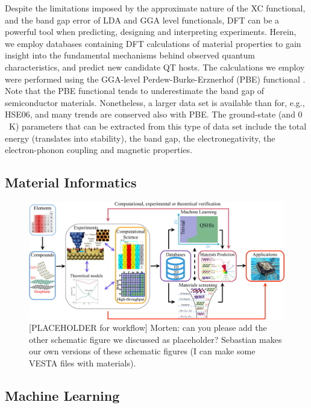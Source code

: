 \documentclass[superscriptaddress,unsortedaddress,
 amsmath,amssymb,
 aps,
]{revtex4-2}
\begin{document}
Despite the limitations imposed by the approximate nature of the XC functional, and the band gap error of LDA and GGA level functionals, 
DFT can be a powerful tool when predicting, designing and interpreting experiments. 
Herein, we employ databases containing DFT calculations of material properties to gain insight into the fundamental mechanisms behind observed quantum characteristics, and predict new candidate QT hosts. 
The calculations we employ were performed using the GGA-level Perdew-Burke-Erznerhof (PBE) functional \cite{Perdew1996}. 
Note that the PBE functional tends to underestimate the band gap of semiconductor materials.  
Nonetheless, a larger data set is available than for, e.g., HSE06, and many trends are conserved also with PBE. 
The ground-state (and $0$~K) parameters that can be extracted from this type of data set include the total energy (translates into stability), the band gap, the electronegativity, the electron-phonon coupling and magnetic properties. 

\subsection*{Material Informatics} %

\begin{figure}[t]
    \centering
    \includegraphics[width=\textwidth]{figures/ht-workflow.jpg}
    \caption{[PLACEHOLDER for workflow] Morten: can you please add the other schematic figure we discussed as placeholder? Sebastian makes our own versions of these schematic figures (I can make some VESTA files with materials). }
    \label{fig:ht-workflow}
\end{figure}

\subsection*{Machine Learning} %
\end{document}

